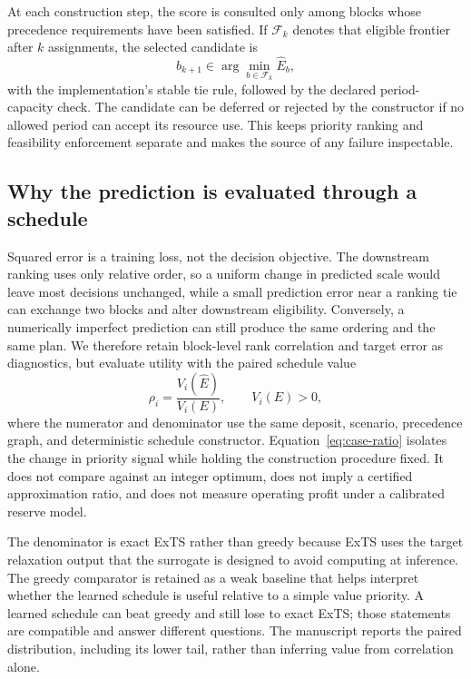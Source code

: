 \documentclass[11pt]{article}
\begin{document}
At each construction step, the score is consulted only among blocks whose precedence requirements have been satisfied. If $\mathcal{F}_k$ denotes that eligible frontier after $k$ assignments, the selected candidate is
\begin{equation}
b_{k+1}\in\arg\min_{b\in\mathcal{F}_k}\hat E_b,
\label{eq:frontier-selection}
\end{equation}
with the implementation's stable tie rule, followed by the declared period-capacity check. The candidate can be deferred or rejected by the constructor if no allowed period can accept its resource use. This keeps priority ranking and feasibility enforcement separate and makes the source of any failure inspectable.

\subsection{Why the prediction is evaluated through a schedule}
Squared error is a training loss, not the decision objective. The downstream ranking uses only relative order, so a uniform change in predicted scale would leave most decisions unchanged, while a small prediction error near a ranking tie can exchange two blocks and alter downstream eligibility. Conversely, a numerically imperfect prediction can still produce the same ordering and the same plan. We therefore retain block-level rank correlation and target error as diagnostics, but evaluate utility with the paired schedule value
\begin{equation}
\rho_i=\frac{V_i(\hat E)}{V_i(E)},\qquad V_i(E)>0,
\label{eq:case-ratio}
\end{equation}
where the numerator and denominator use the same deposit, scenario, precedence graph, and deterministic schedule constructor. Equation~\ref{eq:case-ratio} isolates the change in priority signal while holding the construction procedure fixed. It does not compare against an integer optimum, does not imply a certified approximation ratio, and does not measure operating profit under a calibrated reserve model.

The denominator is exact ExTS rather than greedy because ExTS uses the target relaxation output that the surrogate is designed to avoid computing at inference. The greedy comparator is retained as a weak baseline that helps interpret whether the learned schedule is useful relative to a simple value priority. A learned schedule can beat greedy and still lose to exact ExTS; those statements are compatible and answer different questions. The manuscript reports the paired distribution, including its lower tail, rather than inferring value from correlation alone.
\end{document}
